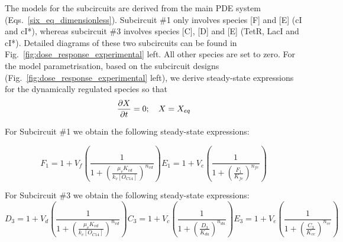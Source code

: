 The models for the subcircuits are derived from the main PDE system (Eqs.~\ref{six_eq_dimensionless}).
Subcircuit \#1 only involves species [F] and [E] (cI and cI*), whereas subcircuit \#3 involves species [C], [D] and [E]
(TetR, LacI and cI*).
Detailed diagrams of these two subcircuits can be found in Fig.~\ref{fig:dose_response_experimental} left.
All other species are set to zero.
For the model parametrisation, based on the subcircuit designs (Fig.~\ref{fig:dose_response_experimental} left),
we derive steady-state expressions for the dynamically regulated species so that
\begin{equation}
    \pdv{X}{t}=0; \quad X=X_{eq}
\end{equation}

For Subcircuit \#1 we obtain the following steady-state expressions:

\begin{subequations}\label{Subcircuit 1 equations}
\begin{equation}
    F_1 = 1 + V_f \left( \frac{1}{1+ \left( \frac{\mu_v K_{vd}}{k_v [O_{C14}]} \right)^{n_{vd}}} \right)
\end{equation}
\begin{equation}
    E_1 = 1 + V_e \left( \frac{1}{1+ \left( \frac{F_1}{K_{fe}} \right)^{n_{fe}}} \right)
\end{equation}
\end{subequations}

For Subcircuit \#3 we obtain the following steady-state expressions:
\begin{subequations}\label{Subcircuit 3 equations}
\begin{equation}
    D_3 = 1 + V_d \left( \frac{1}{1+ \left( \frac{\mu_v K_{vd}}{k_v [O_{C14}]} \right)^{n_{vd}}} \right)
\end{equation}
\begin{equation}
    C_3 = 1 + V_c \left( \frac{1}{1+ \left( \frac{D_3}{K_{da}} \right)^{n_{da}}} \right)
\end{equation}
\begin{equation}
    E_3 = 1 + V_e \left( \frac{1}{1+ \left( \frac{C_3}{K_{ce}} \right)^{n_{ce}}} \right)
\end{equation}
\end{subequations}

